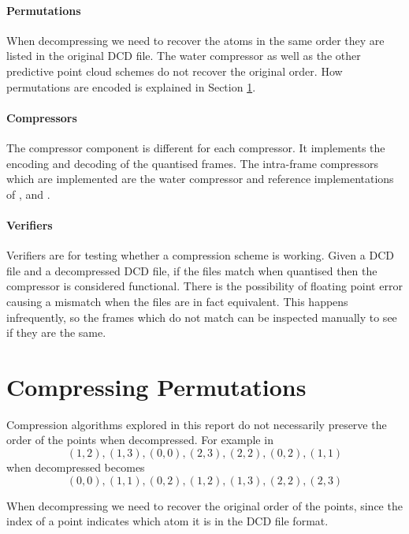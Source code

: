 \documentclass[a4paper]{report}
\begin{document}
\paragraph{Permutations}

When decompressing we need to recover the atoms in the same order they are
listed in the original DCD file. The water compressor as well as the other
predictive point cloud schemes do not recover the original order. How
permutations are encoded is explained in Section \ref{sec:compr-perm}.


\paragraph{Compressors}

The compressor component is different for each compressor. It implements the
encoding and decoding of the quantised frames. The intra-frame compressors
which are implemented are the water compressor and reference implementations
of \citet{omeltchenko2000sls}, \citet{gumholdcomp} and
\citet{devillers2000gci}.


\paragraph{Verifiers}

Verifiers are for testing whether a compression scheme is working. Given a DCD
file and a decompressed DCD file, if the files match when quantised then the
compressor is considered functional. There is the possibility of floating
point error causing a mismatch when the files are in fact equivalent. This
happens infrequently, so the frames which do not match can be inspected
manually to see if they are the same.


\section{Compressing Permutations}
\label{sec:compr-perm}

Compression algorithms explored in this report do not necessarily preserve the
order of the points when decompressed. For example in \citet{devillers2000gci}
\[ (1, 2), (1, 3), (0, 0), (2, 3), (2, 2), (0, 2), (1, 1) \]
when decompressed becomes
\[ (0, 0), (1, 1), (0, 2), (1, 2), (1, 3), (2, 2), (2, 3) \]

When decompressing we need to recover the original order of the points, since
the index of a point indicates which atom it is in the DCD file format.
\end{document}
